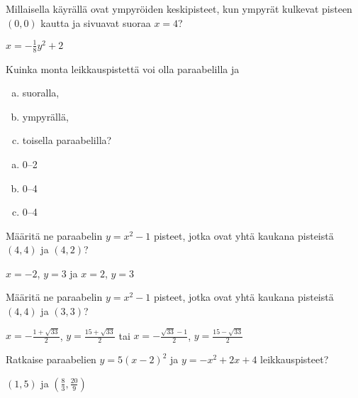 \begin{tehtavasivu}
\begin{tehtava}
Millaisella käyrällä ovat ympyröiden keskipisteet, kun ympyrät kulkevat pisteen $(0, 0)$ kautta ja sivuavat suoraa $x=4$?
\begin{vastaus}
$x=-\frac{1}{8}y^2+2$
\end{vastaus}
\end{tehtava}

\begin{tehtava}
Kuinka monta leikkauspistettä voi olla paraabelilla ja
\begin{enumerate}[a)]
\item suoralla,
\item ympyrällä,
\item toisella paraabelilla?
\end{enumerate}
\begin{vastaus}
\begin{enumerate}[a)]
\item 0--2
\item 0--4
\item 0--4
\end{enumerate}
\end{vastaus}
\end{tehtava}

\begin{tehtava}
Määritä ne paraabelin $y=x^2-1$ pisteet, jotka ovat yhtä kaukana pisteistä $(4, 4)$ ja $(4, 2)$?
\begin{vastaus}
$x=-2$, $y=3$ ja $x=2$, $y=3$
\end{vastaus}
\end{tehtava}

\begin{tehtava}
Määritä ne paraabelin $y=x^2-1$ pisteet, jotka ovat yhtä kaukana pisteistä $(4, 4)$ ja $(3, 3)$?
\begin{vastaus}
$x = -\frac{1+\sqrt{33}}{2}$,   $y = \frac{15+\sqrt{33}}{2}$ tai $x = -\frac{\sqrt{33}-1}{2}$,   $y = \frac{15-\sqrt{33}}{2}$
\end{vastaus}
\end{tehtava}

\begin{tehtava}
Ratkaise paraabelien $y=5(x-2)^2$  ja $y=-x^2+2x+4$ leikkauspisteet?
\begin{vastaus}
$(1, 5)$ ja $(\frac{8}{3}, \frac{20}{9})$
\end{vastaus}
\end{tehtava}


\end{tehtavasivu}
